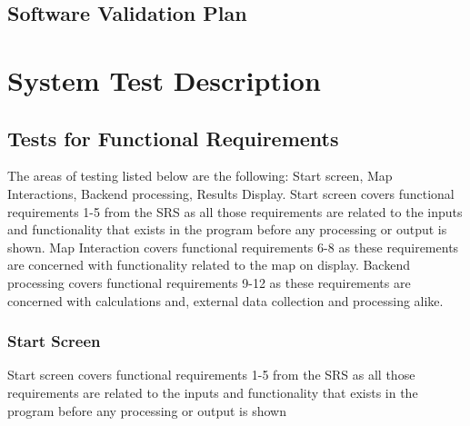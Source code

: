 \documentclass[12pt, titlepage]{article}
\begin{document}


\subsection{Software Validation Plan}


\section{System Test Description}
	
\subsection{Tests for Functional Requirements}

The areas of testing listed below are the following: Start screen, Map Interactions, 
Backend processing, Results Display. Start screen covers functional requirements 1-5 
from the SRS as all those requirements are related to the inputs and functionality that 
exists in the program before any processing or output is shown. Map Interaction covers 
functional requirements 6-8 as these requirements are concerned with functionality related 
to the map on display. Backend processing covers functional requirements 9-12 as these 
requirements are concerned with calculations and, external data collection and processing 
alike.

\subsubsection{Start Screen}

Start screen covers functional requirements 1-5 from the SRS as all those requirements 
are related to the inputs and functionality that exists in the program before any 
processing or output is shown
		
\end{document}
